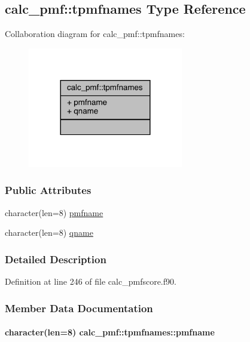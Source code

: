 \hypertarget{structcalc__pmf_1_1tpmfnames}{\subsection{calc\-\_\-pmf\-:\-:tpmfnames Type Reference}
\label{structcalc__pmf_1_1tpmfnames}
}


Collaboration diagram for calc\-\_\-pmf\-:\-:tpmfnames\-:
\nopagebreak
\begin{figure}[H]
\begin{center}
\leavevmode
\includegraphics[width=192pt]{structcalc__pmf_1_1tpmfnames__coll__graph}
\end{center}
\end{figure}
\subsubsection*{Public Attributes}
\begin{DoxyCompactItemize}
\item 
character(len=8) \hyperlink{structcalc__pmf_1_1tpmfnames_a55d75a2cf964727b329e2dfcd3ae67b3}{pmfname}
\item 
character(len=8) \hyperlink{structcalc__pmf_1_1tpmfnames_a9cab1ea5a258960e24cf9ec1eb48c3ba}{qname}
\end{DoxyCompactItemize}


\subsubsection{Detailed Description}


Definition at line 246 of file calc\-\_\-pmfscore.\-f90.



\subsubsection{Member Data Documentation}
\hypertarget{structcalc__pmf_1_1tpmfnames_a55d75a2cf964727b329e2dfcd3ae67b3}{
\paragraph[{pmfname}]{\setlength{\rightskip}{0pt plus 5cm}character(len=8) calc\-\_\-pmf\-::tpmfnames\-::pmfname}}\label{structcalc__pmf_1_1tpmfnames_a55d75a2cf964727b329e2dfcd3ae67b3}


